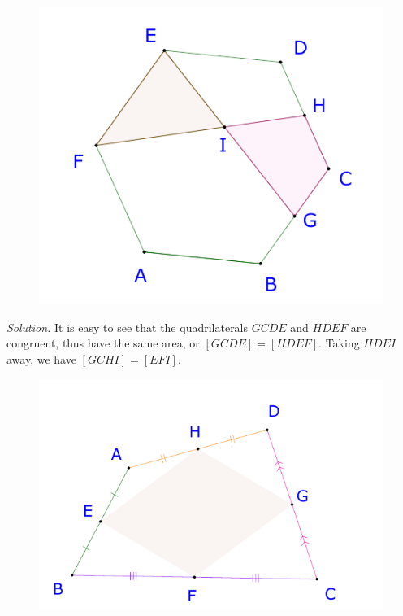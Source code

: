 \begin{multicols}{2}
\begin{figure}[H]
		\includegraphics[width= 1\linewidth]{23-24-s3-i-p4.pdf}
		\vspace*{-10pt}
	\end{figure}
	\textit{Solution.}
	It is easy to see that the quadrilaterals $GCDE$ and $HDEF$ are congruent, thus have the same area, or $[GCDE] = [HDEF].$
	Taking $HDEI$ away, we have $[GCHI] = [EFI].$ 
	\vskip 0.2cm
	\begin{figure}[H]
		\vspace*{-5pt}
		\centering
		\captionsetup{labelformat= empty, justification=centering}
		\includegraphics[width= 1\linewidth]{23-24-s3-i-p5.pdf}

\end{figure}
\end{multicols}
